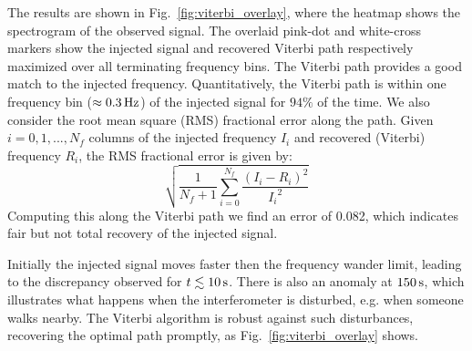 \documentclass[paper-main.tex]{subfiles}
\begin{document}
The results are shown in Fig.~\ref{fig:viterbi_overlay}, where the heatmap shows the spectrogram of the observed signal. 
The overlaid pink-dot and white-cross markers show the injected signal and recovered Viterbi path respectively maximized over all terminating frequency bins. 
The Viterbi path provides a good match to the injected frequency. 
Quantitatively, the Viterbi path is within one frequency bin ($\approx 0.3\,{\rm Hz}$) of the injected signal for $94\%$ of the time. 
We also consider the root mean square (RMS) fractional error along the path. Given $i=0,1,...,N_f$ columns of the injected frequency $I_i$ and recovered (Viterbi) frequency $R_i$, the RMS fractional error is given by:
\begin{equation}
\sqrt{ \frac{1}{N_f+1} \sum_{i=0}^{N_f} \frac{(I_i - R_i)^2}{{I_i}^2} }
\end{equation}
Computing this along the Viterbi path we find an error of 0.082, which indicates fair but not total recovery of the injected signal.


Initially the injected signal moves faster then the frequency wander limit, leading to the discrepancy observed for $t\lesssim 10\,{\rm s}$. 
There is also an anomaly at $150\,{\rm s}$, which illustrates what happens when the interferometer is disturbed, e.g. when someone walks nearby. 
The Viterbi algorithm is robust against such disturbances, recovering the optimal path promptly, as Fig.~\ref{fig:viterbi_overlay} shows. 

\end{document}
